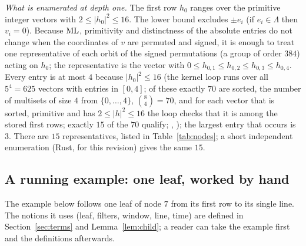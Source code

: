 \documentclass[11pt]{article}
\theoremstyle{remark}
\newcommand{\lean}[1]{{\small\texttt{\detokenize{#1}}}}
\begin{document}
\emph{What is enumerated at depth one.} The first row $h_0$ ranges over the primitive integer vectors with $2\le|h_0|^2\le16$. The lower bound excludes $\pm e_i$ (if $e_i\in\Lambda$ then $v_i=0$). Because $\mathrm{ML}$, primitivity and distinctness of the absolute entries do not change when the coordinates of $v$ are permuted and signed, it is enough to treat one representative of each orbit of the signed permutations (a group of order $384$) acting on $h_0$; the representative is the vector with $0\le h_{0,1}\le h_{0,2}\le h_{0,3}\le h_{0,4}$. Every entry is at most $4$ because $|h_0|^2\le16$ (the kernel loop \lean{chkAllOf} runs over all $5^4=625$ vectors with entries in $[0,4]$; of these exactly $70$ are sorted, the number of multisets of size $4$ from $\{0,\dots,4\}$, $\binom{8}{4}=70$, and for each vector that is sorted, primitive and has $2\le|h|^2\le16$ the loop checks that it is among the stored first rows; exactly $15$ of the $70$ qualify; \lean{T1Ok4}, \lean{depth1_cover4}); the largest entry that occurs is $3$. There are $15$ representatives, listed in Table~\ref{tab:nodes}; a short independent enumeration (Rust, for this revision) gives the same $15$.

\subsection{A running example: one leaf, worked by hand}\label{sec:running}

The example below follows one leaf of node $7$ from its first row to its single line. The notions it uses (leaf, filters, window, line, time) are defined in Section~\ref{sec:terms} and Lemma~\ref{lem:child}; a reader can take the example first and the definitions afterwards.
\end{document}
